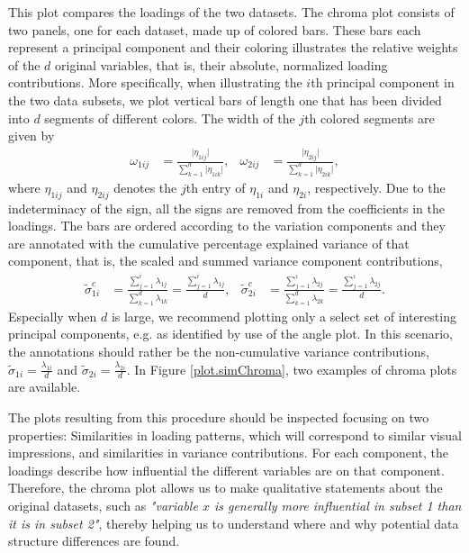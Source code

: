 \documentclass[titlepage,11pt,twoside]{article}
\begin{document}
This plot compares the loadings of the two datasets. The chroma plot consists of two panels, one for each dataset, made up of colored bars. These bars each represent a principal component and their coloring illustrates the relative weights of the $d$ original variables, that is, their absolute, normalized loading contributions. More specifically, when illustrating the $i$th principal component in the two data subsets, we plot vertical bars of length one that has been divided into $d$ segments of different colors. The width of the $j$th colored segments are given by
\begin{align*}
\omega_{1ij} &= \frac{\lvert\eta_{1ij}\rvert}{\sum_{k=1}^d \lvert\eta_{1ik}\rvert}, &
\omega_{2ij} &= \frac{\lvert\eta_{2ij}\rvert}{\sum_{k=1}^d \lvert\eta_{2ik}\rvert},
\end{align*}
where $\eta_{1ij}$ and $\eta_{2ij}$ denotes the $j$th entry of $\eta_{1i}$ and $\eta_{2i}$, respectively. Due to the indeterminacy of the sign, all the signs are removed from the coefficients in the loadings. The bars are ordered according to the variation components and they are annotated with the cumulative percentage explained variance of that component, that is, the scaled and summed variance component contributions,
\begin{align*}
\tilde\sigma^c_{1i} &= \frac{\sum_{j=1}^i \lambda_{1j}}{\sum_{k=1}^d \lambda_{1k}} = \frac{\sum_{j=1}^i \lambda_{1j}}{d}, &
\tilde\sigma^c_{2i} &= \frac{\sum_{j=1}^i \lambda_{2j}}{\sum_{k=1}^d \lambda_{2k}} = \frac{\sum_{j=1}^i \lambda_{2j}}{d}.
\end{align*}
Especially when $d$ is large, we recommend plotting only a select set of interesting principal components, e.g. as identified by use of the angle plot. In this scenario, the annotations should rather be the non-cumulative variance contributions, $\tilde\sigma_{1i} = \frac{\lambda_{1i}}{d}$ and $\tilde\sigma_{2i} = \frac{\lambda_{2i}}{d}$. In Figure \ref{plot.simChroma}, two examples of chroma plots are available. 

The plots resulting from this procedure should be inspected focusing on two properties: Similarities in loading patterns, which will correspond to similar visual impressions, and similarities in variance contributions. For each component, the loadings describe how influential the different variables are on that component. Therefore, the chroma plot allows us to make qualitative statements about the original datasets, such as \textit{"variable $x$ is generally more influential in subset 1 than it is in subset 2"}, thereby helping us to understand where and why potential data structure differences are found.
\end{document}
